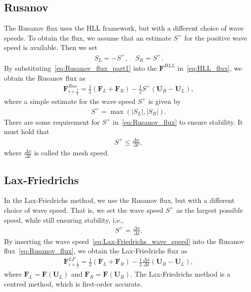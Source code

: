 \subsection*{Rusanov}
The Rusanov flux uses the HLL framework, but with a different choice of wave speeds.
To obtain the flux, we assume that an estimate $S^+$ for the positive wave speed is available.
Then we set 
\begin{align}\label{eq:Rusanov_flux_part1}
    S_L = -S^+, \quad S_R = S^+.
\end{align}
By substituting~\eqref{eq:Rusanov_flux_part1} into the $\mathbf{F}^{HLL}$ in~\eqref{eq:HLL_flux}, we obtain the Rusanov flux as
\begin{align}\label{eq:Rusanov_flux}
    \mathbf{F}_{i+\frac{1}{2}}^{Rus} = \frac{1}{2} \left( \mathbf{F}_{L} + \mathbf{F}_{R}  \right)
    - \frac{1}{2} S^+ \left( \mathbf{U}_R - \mathbf{U}_L \right),
\end{align}
where a simple estimate for the wave speed $S^+$ is given by
\begin{align*}
    S^+ = \max ( |S_L|, |S_R|).
\end{align*}
There are some requirement for $S^+$ in~\eqref{eq:Rusanov_flux} to ensure stability.
It must hold that 
\begin{align*}
    S^+ \leq \frac{\Delta x}{\Delta t},
\end{align*}
where $\frac{\Delta x}{\Delta t}$ is called the mesh speed.

\subsection*{Lax-Friedrichs}
In the Lax-Friedrichs method, we use the Rusanov flux, but with a different choice of wave speed.
That is, we set the wave speed $S^+$ as the largest possible speed, while still ensuring stability, i.e.,
\begin{align}\label{eq:Lax-Friedrichs_wave_speed}
    S^+ = \frac{\Delta x}{\Delta t}.
\end{align}
By inserting the wave speed~\eqref{eq:Lax-Friedrichs_wave_speed} into the Rusanov flux~\eqref{eq:Rusanov_flux}, we obtain the Lax-Friedrichs flux as
\begin{align*}
    \mathbf{F}_{i+\frac{1}{2}}^{LF} = \frac{1}{2} \left( {\mathbf{F}}_{L} + {\mathbf{F}}_{R} \right) - \frac{1}{2} \frac{\Delta x}{\Delta t} \left( \mathbf{U}_R - \mathbf{U}_L \right),
\end{align*}
where $\mathbf{F}_L = \mathbf{F}(\mathbf{U}_L)$ and $\mathbf{F}_R = \mathbf{F}(\mathbf{U}_R)$.
The Lax-Friedrichs method is a centred method, which is first-order accurate.


